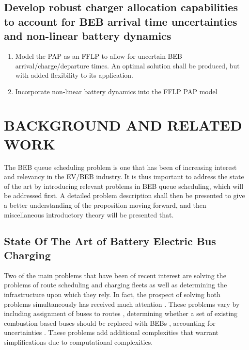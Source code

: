 \documentclass[ee,msthesis]{usuthesis}
\begin{document}
\section{Develop robust charger allocation capabilities to account for BEB arrival time uncertainties and non-linear battery dynamics}
\label{sec:obj-math-model-robust}
\begin{enumerate}
\item Model the PAP as an FFLP to allow for uncertain BEB arrival/charge/departure times. An optimal solution shall be
produced, but with added flexibility to its application.

\item Incorporate non-linear battery dynamics into the FFLP PAP model
\end{enumerate}
\chapter{BACKGROUND AND RELATED WORK}
\label{sec:background-and-related-work}
The BEB queue scheduling problem is one that has been of increasing interest and relevancy in the EV/BEB industry. It is
thus important to address the state of the art by introducing relevant problems in BEB queue scheduling, which will be
addressed first. A detailed problem description shall then be presented to give a better understanding of the
proposition moving forward, and then miscellaneous introductory theory will be presented that.

\section{State Of The Art of Battery Electric Bus Charging}
\label{sec:state-of-the-art}
Two of the main problems that have been of recent interest are solving the problems of route scheduling and charging
fleets as well as determining the infrastructure upon which they rely. In fact, the prospect of solving both problems
simultaneously has received much attention \cite{wei-2018-optim-spatio,sebastiani-2016-evaluat-elect,hoke-2014-accoun-lithium,wang-2017-elect-vehic}. These problems vary by including assignment of buses to routes
\cite{rinaldi-2020-mixed-fleet,zhou-2020-collab-optim,tang-2019-robus-sched,li-2014-trans-bus}, determining
whether a set of existing combustion based buses should be replaced with BEBs \cite{zhou-2020-bi-objec,duan-2021-refor-mixed,rinaldi-2020-mixed-fleet,zhou-2020-collab-optim}, accounting for uncertainties
\cite{bie-2021-optim-elect,duan-2021-refor-mixed,tang-2019-robus-sched,ursavas-2016-optim-polic}. These problems
add additional complexities that warrant simplifications due to computational complexities.
\end{document}
